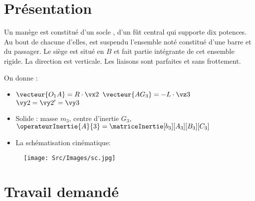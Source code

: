 \documentclass[11pt]{article}
\begin{document}
\UPSTIbuildPage 

\section{Présentation}
\begin{wrapfigure}{r}{4cm}
  \centering
  \vspace{-2em}
  \vspace{-8em}
\end{wrapfigure}
Un manège est constitué d'un socle , d'un fût central  qui supporte dix potences. Au bout de chacune d'elles, est suspendu l'ensemble noté  constitué d'une barre et du passager. Le siège est situé en $B$ et fait partie intégrante de cet ensemble  rigide. La direction  est verticale. Les liaisons sont parfaites et sans frottement.

On donne :
\begin{itemize}
\item $\vecteur{O_1A}=R\cdot\vx2$ \qquad $\vecteur{AG_3}=-L\cdot\vz3$ \qquad $\vy2=\vy2'=\vy3$
\item Solide : masse $m_3$, centre d'inertie $G_3$, $\operateurInertie{A}{3}=\matriceInertie[b_3][A_3][B_3][C_3]$
\item La schématisation cinématique:
\end{itemize}

\begin{figure}[!ht]
    \centering
	\texttt{[image: Src/Images/sc.jpg]}
\end{figure}


\section{Travail demandé}

\end{document}
